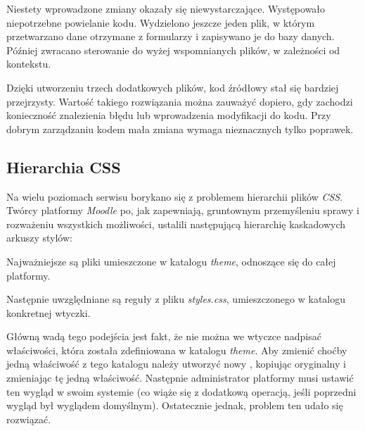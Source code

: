 Niestety wprowadzone zmiany okazały się niewystarczające. Występowało niepotrzebne powielanie kodu. Wydzielono jeszcze jeden plik, w którym przetwarzano dane otrzymane z formularzy i zapisywano je do bazy danych. Później zwracano sterowanie do wyżej wspomnianych plików, w zależności od kontekstu.

Dzięki utworzeniu trzech dodatkowych plików, kod źródłowy stał się bardziej przejrzysty. Wartość takiego rozwiązania można zauważyć dopiero, gdy zachodzi konieczność znalezienia błędu lub wprowadzenia modyfikacji do kodu. Przy dobrym zarządzaniu kodem mała zmiana wymaga nieznacznych tylko poprawek.

\subsection{Hierarchia CSS}
\label{Chapter62a}

Na wielu poziomach serwisu borykano się z problemem hierarchii plików \textit{CSS}. Twórcy platformy \textit{Moodle} po, jak zapewniają, gruntownym przemyśleniu sprawy i rozważeniu wszystkich możliwości, ustalili następującą hierarchię kaskadowych arkuszy stylów:
\begin{description}
\item Najważniejsze są pliki umieszczone w katalogu \textit{theme}, odnoszące się do całej platformy.
\item Następnie uwzględniane są reguły z pliku \textit{styles.css}, umieszczonego w katalogu konkretnej wtyczki.
\end{description}
Główną wadą tego podejścia jest fakt, że nie można we wtyczce nadpisać właściwości, która została zdefiniowana w katalogu \textit{theme}. Aby zmienić choćby jedną właściwość z tego katalogu należy utworzyć nowy , kopiując oryginalny i zmieniając tę jedną właściwość. Następnie administrator platformy musi ustawić ten wygląd w swoim systemie (co wiąże się z dodatkową operacją, jeśli poprzedni wygląd był wyglądem domyślnym). Ostatecznie jednak, problem ten udało się rozwiązać. %